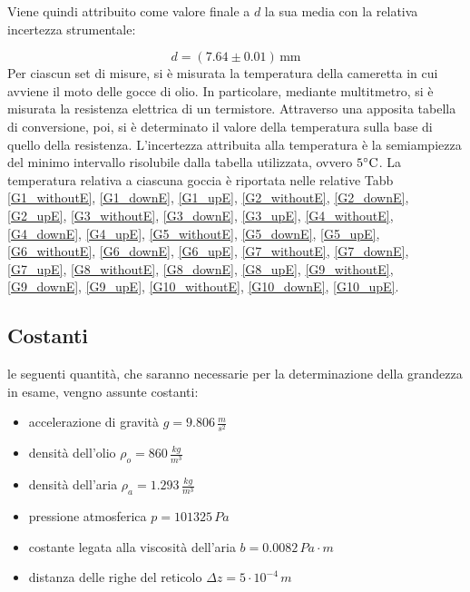 \documentclass[]{article}
\let\oldsubsection\subsection%
\renewcommand{\subsection}{%
	\renewcommand{\theequation}{\thesubsection.\arabic{equation}}%
	\oldsubsection}%
\begin{document}
    Viene quindi attribuito come valore finale a $ d $ la sua media con la relativa incertezza strumentale:

    \begin{equation}
        \label{misura_Rb}
        d = (7.64 \pm 0.01) \, \text{mm}
    \end{equation} 
    Per ciascun set di misure, si è misurata la temperatura della cameretta in cui avviene il moto delle gocce di olio. In particolare, mediante multitmetro, si è misurata la resistenza elettrica di un termistore. Attraverso una apposita tabella di conversione, poi, si è determinato il valore della temperatura sulla base di quello della resistenza. L'incertezza attribuita alla temperatura è la semiampiezza del minimo intervallo risolubile dalla tabella utilizzata, ovvero $5 \degree \text{C}$.
    La temperatura relativa a ciascuna goccia è riportata nelle relative Tabb \ref{G1_withoutE}, \ref{G1_downE}, \ref{G1_upE}, \ref{G2_withoutE}, \ref{G2_downE}, \ref{G2_upE}, \ref{G3_withoutE}, \ref{G3_downE}, \ref{G3_upE}, \ref{G4_withoutE}, \ref{G4_downE}, \ref{G4_upE}, \ref{G5_withoutE}, \ref{G5_downE}, \ref{G5_upE}, \ref{G6_withoutE}, \ref{G6_downE}, \ref{G6_upE}, \ref{G7_withoutE}, \ref{G7_downE}, \ref{G7_upE}, \ref{G8_withoutE}, \ref{G8_downE}, \ref{G8_upE}, \ref{G9_withoutE}, \ref{G9_downE}, \ref{G9_upE}, \ref{G10_withoutE}, \ref{G10_downE}, \ref{G10_upE}.

    \subsection {Costanti}
    \label{par:costanti}

    le seguenti quantità, che saranno necessarie per la determinazione della grandezza in esame, vengno assunte costanti:

    \begin{itemize}

        \item accelerazione di gravità $g = 9.806 \, \frac{m}{s^2}$
        \item densità dell'olio $\rho_o = 860 \, \frac{kg}{m^3}$
        \item densità dell'aria $\rho_a = 1.293 \, \frac{kg}{m^3}$
        \item pressione atmosferica $ p = 101325 \, Pa $
        \item costante legata alla viscosità dell'aria $b = 0.0082 \,  Pa \cdot m $
        \item distanza delle righe del reticolo $ \Delta z = 5 \cdot 10 ^{-4} \, m$
        
    \end{itemize}
\end{document}
